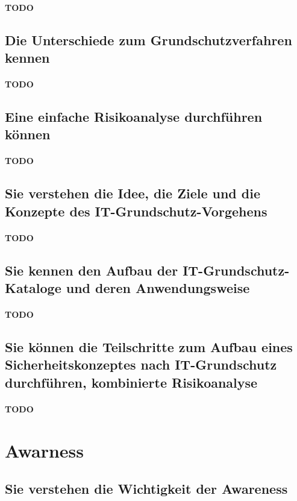 \documentclass[10pt,a4paper]{article}
\begin{document}
\paragraph*{TODO}
\subsection*{Die Unterschiede zum Grundschutzverfahren kennen}
\paragraph*{TODO}
\subsection*{Eine einfache Risikoanalyse durchführen können}
\paragraph*{TODO}
\subsection*{Sie verstehen die Idee, die Ziele und die Konzepte des IT-Grundschutz-Vorgehens}
\paragraph*{TODO}
\subsection*{Sie kennen den Aufbau der IT-Grundschutz-Kataloge und deren Anwendungsweise}
\paragraph*{TODO}
\subsection*{Sie können die Teilschritte zum Aufbau eines Sicherheitskonzeptes nach IT-Grundschutz durchführen, kombinierte Risikoanalyse}
\paragraph*{TODO}


\section{Awarness}
\subsection*{Sie verstehen die Wichtigkeit der \flqq Awareness \frqq}
\end{document}
